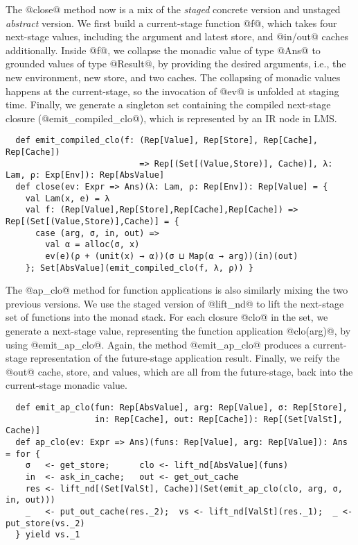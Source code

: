 The @close@ method now is a mix of the \textit{staged} concrete version and
unstaged \textit{abstract} version. We first build a current-stage function
@f@, which takes four next-stage values, including the argument and latest
store, and @in/out@ caches additionally. Inside @f@, we collapse the monadic
value of type @Ans@ to grounded values of type @Result@, by providing the
desired arguments, i.e., the new environment, new store, and two caches. The
collapsing of monadic values happens at the current-stage, so the invocation of
@ev@ is unfolded at staging time. Finally, we generate a singleton set
containing the compiled next-stage closure (@emit_compiled_clo@), which is
represented by an IR node in LMS.
\begin{lstlisting}
  def emit_compiled_clo(f: (Rep[Value], Rep[Store], Rep[Cache], Rep[Cache])
                           => Rep[(Set[(Value,Store)], Cache)], λ: Lam, ρ: Exp[Env]): Rep[AbsValue]
  def close(ev: Expr => Ans)(λ: Lam, ρ: Rep[Env]): Rep[Value] = {
    val Lam(x, e) = λ
    val f: (Rep[Value],Rep[Store],Rep[Cache],Rep[Cache]) => Rep[(Set[(Value,Store)],Cache)] = {
      case (arg, σ, in, out) =>
        val α = alloc(σ, x)
        ev(e)(ρ + (unit(x) → α))(σ ⊔ Map(α → arg))(in)(out)
    }; Set[AbsValue](emit_compiled_clo(f, λ, ρ)) }
\end{lstlisting}

The @ap_clo@ method for function applications is also similarly mixing the two
previous versions.  We use the staged version of @lift_nd@ to lift the
next-stage set of functions into the monad stack.
For each closure @clo@ in the set, we generate a next-stage value, representing
the function application @clo(arg)@, by using @emit_ap_clo@.  Again, the method
@emit_ap_clo@ produces a current-stage representation of the future-stage
application result.  Finally, we reify the @out@ cache, store, and values,
which are all from the future-stage, back into the current-stage monadic value.
\begin{lstlisting}
  def emit_ap_clo(fun: Rep[AbsValue], arg: Rep[Value], σ: Rep[Store],
                  in: Rep[Cache], out: Rep[Cache]): Rep[(Set[ValSt], Cache)]
  def ap_clo(ev: Expr => Ans)(funs: Rep[Value], arg: Rep[Value]): Ans = for {
    σ   <- get_store;      clo <- lift_nd[AbsValue](funs)
    in  <- ask_in_cache;   out <- get_out_cache
    res <- lift_nd[(Set[ValSt], Cache)](Set(emit_ap_clo(clo, arg, σ, in, out)))
    _   <- put_out_cache(res._2);  vs <- lift_nd[ValSt](res._1);  _ <- put_store(vs._2)
  } yield vs._1
\end{lstlisting}

